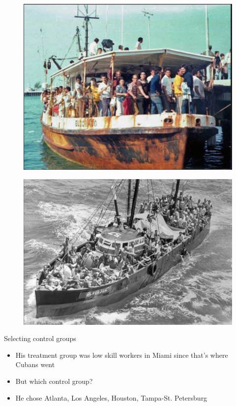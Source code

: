 \documentclass{beamer}
\begin{document}
\begin{frame}[plain]
	\begin{figure}
	\includegraphics[scale=0.25]{./lecture_includes/boatlift3.png}
	\end{figure}
\end{frame}

\begin{frame}[plain]
	\begin{figure}
	\includegraphics[scale=0.25]{./lecture_includes/boatlift4.png}
	\end{figure}
\end{frame}



\begin{frame}{Selecting control groups}

\begin{itemize}

\item His treatment group was low skill workers in Miami since that's where Cubans went
\item But which control group?
\item He chose Atlanta, Los Angeles, Houston, Tampa-St. Petersburg

\end{itemize}

\end{frame}
\end{document}
